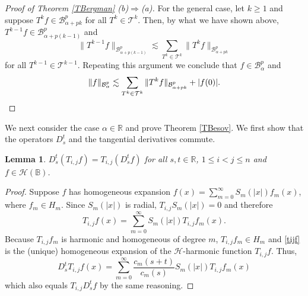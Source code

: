 \documentclass{amsart}
\newtheorem{lemma}[theorem]{Lemma}
\theoremstyle{definition}
\theoremstyle{remark}
\begin{document}
\begin{proof}[Proof of Theorem \ref{TBergman} (b)$\Rightarrow$(a)]
For the general case, let $k\ge 1$ and suppose $T^k f\in\mathcal B^p_{\alpha+pk}$
for all $T^k\in\mathcal T^k$.
Then, by what we have shown above, $T^{k-1}f\in\mathcal B^p_{\alpha+p(k-1)}$ and
\begin{equation*}
\|T^{k-1} f\|_{\mathcal B^p_{\alpha+p(k-1)}}
\lesssim \sum_{T^k\in\mathcal T^k}\|T^k f\|_{\mathcal B^p_{\alpha+pk}}
\end{equation*}
for all $T^{k-1}\in\mathcal T^{k-1}$.
Repeating this argument we conclude that $f\in\mathcal B^p_\alpha$ and
\begin{equation*}
\|f\|_{\mathcal B^p_\alpha}
\lesssim \sum_{T^k\in\mathcal T^k}\|T^k f\|_{\mathcal B^p_{\alpha+pk}}+\vert f(0)\vert.
\qedhere
\end{equation*}
\end{proof}

We next consider the case $\alpha\in\mathbb R$ and prove Theorem \ref{TBesov}.
We first show that the operators $D^t_s$ and the tangential derivatives
commute.

\begin{lemma}\label{LDTcommute}
$D^t_s(T_{i,j}f)=T_{i,j}(D^t_s f)$ for all $s,t\in\mathbb R$, $1\le i<j\le n$
and $f\in\mathcal H(\mathbb B)$.
\end{lemma}

\begin{proof}
Suppose $f$ has homogeneous expansion $f(x)=\sum_{m=0}^\infty S_m(\vert x\vert)f_m(x)$,
where $f_m\in H_m$.
Since $S_m(\vert x\vert)$ is radial, $T_{i,j} S_m(\vert x\vert)=0$ and therefore
\begin{equation}\label{tijf}
T_{i,j} f(x)=\sum_{m=0}^\infty S_m(\vert x\vert) T_{i,j}f_m(x).
\end{equation}
Because $T_{i,j} f_m$ is harmonic and homogeneous of degree $m$, $T_{i,j}f_m\in H_m$
and \eqref{tijf} is the (unique) homogeneous expansion of the $\mathcal H$-harmonic
function $T_{i,j}f$.
Thus,
\begin{equation*}
D^t_sT_{i,j} f(x)=\sum_{m=0}^\infty\frac{c_m(s+t)}{c_m(s)}S_m(\vert x\vert) T_{i,j}f_m(x)
\end{equation*}
which also equals $T_{i,j}D^t_s f$ by the same reasoning.
\end{proof}
\end{document}

